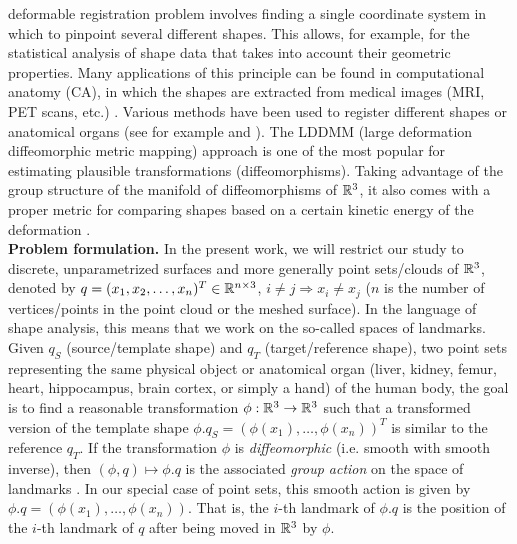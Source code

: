
 deformable registration problem involves finding a single coordinate system in which to pinpoint several different shapes. This allows, for example, for the statistical analysis of shape data that takes into account their geometric properties. Many applications of this principle can be found in computational anatomy (CA), in which the shapes are extracted from medical images (MRI, PET scans, etc.) \cite{Haber04numericalmethods}. Various methods have been used to register different shapes or anatomical organs (see for example \cite{beg2005computing} and \cite{vialard2012diffeomorphic}). The LDDMM (large deformation diffeomorphic metric mapping) approach is one of the most popular for estimating plausible transformations (\ie diffeomorphisms). Taking advantage of the group structure of the manifold of diffeomorphisms of $\mathbb{R}^3$, it also comes with a proper metric for comparing shapes based on a certain kinetic energy of the deformation \cite{dupuis1998variational}.\\



\textbf{Problem formulation.} In the present work, we will restrict our study to discrete, unparametrized surfaces and more generally point sets/clouds of $\mathbb{R}^3$, denoted by $q=(x_1,x_2,\dots,x_n)^T\in \mathbb{R}^{n\times 3}$, $i\ne j \Rightarrow x_i \ne x_j $ ($n$ is the number of vertices/points in the point cloud or the meshed surface). In the language of shape analysis, this means that we work on the so-called spaces of landmarks. Given $q_S$ (source/template shape) and $q_T$ (target/reference shape), two point sets representing the same physical object or anatomical organ (liver, kidney, femur, heart, hippocampus, brain cortex, or simply a hand) of the human body, the goal is to find a reasonable transformation $\phi:\mathbb{R}^3\rightarrow\mathbb{R}^3$ such that a transformed version of the template shape $\phi.q_{S}=(\phi(x_1),\dots,\phi(x_n))^T$ is similar to the reference $q_{T}$. If the transformation $\phi$ is \textit{diffeomorphic} (i.e. smooth with smooth inverse), then $(\phi,q)\mapsto \phi.q$ is the associated \textit{group action} on the space of landmarks \cite{younes2010shapes}. In our special case of point sets, this smooth action is given by $\phi.q=(\phi(x_1),\dots,\phi(x_n))$. That is, the $i$-th landmark of $\phi.q$ is the position of the $i$-th landmark of $q$ after being moved in $\mathbb{R}^3$ by $\phi$. 

